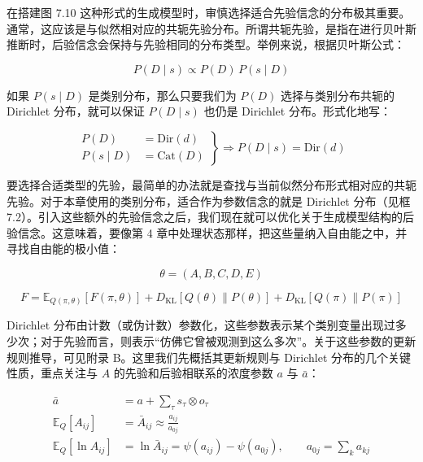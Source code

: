 在搭建图 7.10 这种形式的生成模型时，审慎选择适合先验信念的分布极其重要。通常，这应该是与似然相对应的共轭先验分布。所谓共轭先验，是指在进行贝叶斯推断时，后验信念会保持与先验相同的分布类型。举例来说，根据贝叶斯公式：

\begin{equation}
P(D\mid s)\propto P(D)\,P(s\mid D)
\end{equation}

如果 $P(s\mid D)$ 是类别分布，那么只要我们为 $P(D)$ 选择与类别分布共轭的 Dirichlet 分布，就可以保证 $P(D\mid s)$ 也仍是 Dirichlet 分布。形式化地写：

\begin{equation}
\left.
\begin{aligned}
P(D) &= \mathrm{Dir}(d) \\
P(s\mid D) &= \mathrm{Cat}(D)
\end{aligned}
\right\}
\Rightarrow P(D\mid s)=\mathrm{Dir}(d)
\end{equation}

要选择合适类型的先验，最简单的办法就是查找与当前似然分布形式相对应的共轭先验。对于本章使用的类别分布，适合作为参数信念的就是 Dirichlet 分布（见框 7.2）。引入这些额外的先验信念之后，我们现在就可以优化关于生成模型结构的后验信念。这意味着，要像第 4 章中处理状态那样，把这些量纳入自由能之中，并寻找自由能的极小值：

\begin{equation}
\theta=(A,B,C,D,E)
\label{eq:chapter7-theta}
\end{equation}

\begin{equation}
F=\mathbb{E}_{Q(\pi,\theta)}[F(\pi,\theta)]+D_{\mathrm{KL}}[Q(\theta)\|P(\theta)]+D_{\mathrm{KL}}[Q(\pi)\|P(\pi)]
\label{eq:chapter7-freeenergy-learning}
\end{equation}

Dirichlet 分布由计数（或伪计数）参数化，这些参数表示某个类别变量出现过多少次；对于先验而言，则表示“仿佛它曾被观测到这么多次”。关于这些参数的更新规则推导，可见附录 B。这里我们先概括其更新规则与 Dirichlet 分布的几个关键性质，重点关注与 $A$ 的先验和后验相联系的浓度参数 $a$ 与 $\bar{a}$：

\begin{equation}
\begin{aligned}
\bar{a} &= a + \sum_\tau s_\tau \otimes o_\tau \\
\mathbb{E}_Q[A_{ij}] &= \bar{A}_{ij} \approx \frac{a_{ij}}{a_{0j}} \\
\mathbb{E}_Q[\ln A_{ij}] &= \ln \bar{A}_{ij} = \psi(a_{ij})-\psi(a_{0j}), \qquad a_{0j}=\sum_k a_{kj}
\end{aligned}
\label{eq:chapter7-dirichlet}
\end{equation}

